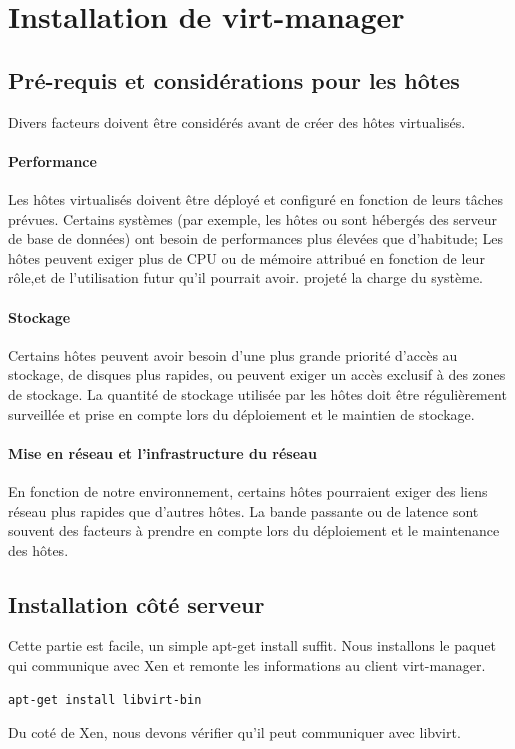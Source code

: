 \chapter{Installation de virt-manager}
\section{Pré-requis et considérations pour les hôtes}
Divers facteurs doivent être considérés avant de créer des hôtes virtualisés.
\subsubsection{Performance} 
Les hôtes virtualisés doivent être déployé et configuré en fonction de leurs tâches prévues. Certains systèmes (par exemple, les hôtes ou sont hébergés des serveur de base de données) ont besoin de performances plus élevées que d'habitude; Les hôtes peuvent exiger plus de CPU ou de mémoire attribué en fonction de leur rôle,et de l'utilisation futur qu'il pourrait avoir. projeté la charge du système.
\subsubsection{Stockage}
Certains hôtes peuvent avoir besoin d'une plus grande priorité d'accès au stockage, de disques plus rapides, ou peuvent exiger un accès exclusif à des zones de stockage. La quantité de stockage utilisée par les hôtes doit être régulièrement surveillée et prise en compte lors du déploiement et le maintien de stockage.
\subsubsection{Mise en réseau et l'infrastructure du réseau}
 En fonction de notre environnement, certains hôtes pourraient exiger des liens réseau plus rapides que d'autres hôtes. La bande passante ou de latence sont souvent des facteurs à prendre en compte lors du déploiement et le maintenance des hôtes.
\section{Installation côté serveur}
Cette partie est facile, un simple apt-get install suffit. Nous installons le paquet qui communique avec Xen et remonte les informations au client virt-manager.
\begin{lstlisting}
apt-get install libvirt-bin
\end{lstlisting} 
Du coté de Xen, nous devons vérifier qu’il peut communiquer avec libvirt.

